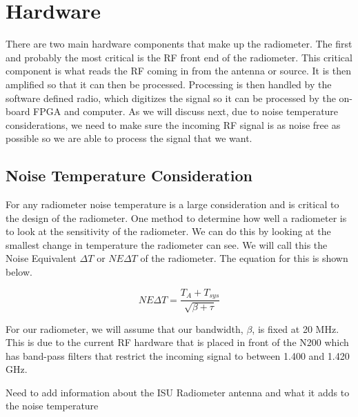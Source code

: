 \section{Hardware}
There are two main hardware components that make up the radiometer.  The first and probably the most critical is the RF front end of the radiometer.  This critical component is what reads the RF coming in from the antenna or source.  It is then amplified so that it can then be processed.  Processing is then handled by the software defined radio, which digitizes the signal so it can be processed by the on-board FPGA and computer.  As we will discuss next, due to noise temperature considerations, we need to make sure the incoming RF signal is as noise free as possible so we are able to process the signal that we want.  



\subsection{Noise Temperature Consideration}

For any radiometer noise temperature is a large consideration and is critical to the design of the radiometer.  One method to determine how well a radiometer is to look at the sensitivity of the radiometer.  We can do this by looking at the smallest change in temperature the radiometer can see.  We will call this the Noise Equivalent $\Delta T$ or $NE\Delta T$ of the radiometer.  The equation for this is shown below.

\begin{equation}
NE\Delta T=\frac{T_{A}+T_{sys}}{\sqrt{\beta + \tau}}
\end{equation}

For our radiometer, we will assume that our bandwidth, $\beta$, is fixed at 20 MHz.  This is due to the current RF hardware that is placed in front of the N200 which has band-pass filters that restrict the incoming signal to between 1.400 and 1.420 GHz. 

Need to add information about the ISU Radiometer antenna and what it adds to the noise temperature

